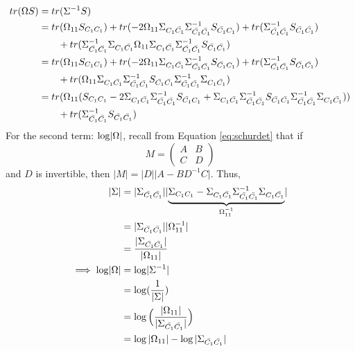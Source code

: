 \documentclass[12pt, leqno]{article}
\providecommand{\abs}[1]{\lvert#1\rvert}
\def\s{\ensuremath\Sigma}
\def\om{\ensuremath\Omega}
\begin{document}
\begin{align}
tr(\om S) &= tr (\s^{-1} S) \nonumber \\
&= tr(\om_{11}S_{C_1 C_1}) + tr(-2\om_{11} \s_{C_1 \bar{C_1}} 
\s_{\bar{C_1} \bar{C_1}}^{-1} S_{{\bar{C_1} {C_1}}}) +  
tr(\s_{\bar{C_1} \bar{C_1}}^{-1} S_{{\bar{C_1} \bar{C_1}}}) \nonumber \\ 
& \qquad + tr(\s_{\bar{C_1}
  \bar{C_1}}^{-1} \s_{C_1 \bar{C_1}}  \om_{11} \s_{{C_1
           \bar{C_1}}} \s_{\bar{C_1}
  \bar{C_1}}^{-1}  S_{{\bar{C_1} \bar{C_1}}}) \nonumber \\
&= tr(\om_{11}S_{C_1 C_1}) + tr(-2\om_{11} \s_{C_1 \bar{C_1}} \s_{\bar{C_1}
  \bar{C_1}}^{-1} S_{{\bar{C_1} {C_1}}}) +  tr(\s_{\bar{C_1}
  \bar{C_1}}^{-1} S_{{\bar{C_1} \bar{C_1}}}) \nonumber \\ 
& \qquad + tr(\om_{11} \s_{{C_1
           \bar{C_1}}} \s_{\bar{C_1}
  \bar{C_1}}^{-1}  S_{{\bar{C_1} \bar{C_1}}} \s_{\bar{C_1}
  \bar{C_1}}^{-1} \s_{C_1 \bar{C_1}}) \nonumber \\
\label{eq:traceterm}
&= tr(\om_{11} (S_{C_1 C_1} -2 \s_{C_1 \bar{C_1}} \s_{\bar{C_1}
  \bar{C_1}}^{-1} S_{{\bar{C_1} {C_1}}}  
+ \s_{{C_1
           \bar{C_1}}} \s_{\bar{C_1}
  \bar{C_1}}^{-1}  S_{{\bar{C_1} \bar{C_1}}} \s_{\bar{C_1}
  \bar{C_1}}^{-1} \s_{C_1 \bar{C_1}})) \\ & \qquad +  tr(\s_{\bar{C_1}
  \bar{C_1}}^{-1} S_{{\bar{C_1} \bar{C_1}}}) \nonumber
\end{align}
For the second term: $\log \abs{\om}$, recall from Equation
\ref{eq:schurdet} that if 
\[
M = \begin{pmatrix}
A&B\\ C&D
\end{pmatrix}
\]
and $D$ is invertible, then $\abs{M} = \abs{D} \abs{A-BD^{-1}C}$. Thus,
\begin{align*}
\abs{\s} &= \abs{\s_{\bar{C_1} \bar{C_1}}}
                    \abs{\underbrace{\s_{C_1 C_1} - \s_{C_1 \bar{C_1}}
                    \s_{\bar{C_1}  \bar{C_1}}^{-1} \s_{{C_1 \bar{C_1}}}}_{\om_{11}^{-1}}}\\
&= \abs{\s_{\bar{C_1} \bar{C_1}}} \abs{\om_{11}^{-1}} \\
&= \frac{\abs{\s_{\bar{C_1} \bar{C_1}}}}{\abs{\om_{11}}} \\
\implies \log \abs{\om} &= \log \abs{\s^{-1}} \\
&= \log(\frac{1}{\abs{\s}}) \\  
& = \log \Big( \frac {\abs{\om_{11}}}{\abs{\s_{\bar{C_1} \bar{C_1}}}} \Big)\\
&= \log{\abs{\om_{11}}} - \log{\abs{\s_{\bar{C_1} \bar{C_1}}}}
\end{align*}
\end{document}
